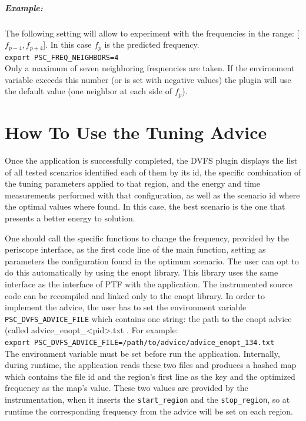 \documentclass[11pt,a4paper, oneside]{book} %
\begin{document}
  \paragraph{Example:} The following setting will allow to experiment with the frequencies in the range: [$f_{p-4},f_{p+4}$]. In this case $f_p$ is the predicted frequency.\\

  \texttt{export PSC\_FREQ\_NEIGHBORS=4}\\


  Only a maximum of seven neighboring frequencies are taken. If the environment variable exceeds this number (or is set with negative values)
  the plugin will use the default value (one neighbor at each side of $f_p$).




\chapter{How To Use the Tuning Advice}
Once the application is successfully completed, the DVFS plugin displays the list of all tested scenarios identified each of them by its id, the specific combination of the tuning
parameters applied to that region, and the energy and time measurements performed with that configuration, as well as the scenario id where the optimal values where found. In this
case, the best scenario is the one that presents a better energy to solution.

One should call the specific functions to change the frequency, provided by the periscope interface, as the first code line of the main function, setting as parameters
the configuration found in the optimum scenario. The user can opt to do this automatically by using the enopt library. This library uses the same interface as the interface of PTF with the application.
The instrumented source code can be recompiled and linked only to the enopt library. In order to implement the advice, the user
has to set the environment variable {\tt PSC\_DVFS\_ADVICE\_FILE} which contains one string:
the path to the enopt advice (called advice\_enopt\_<pid>.txt .
For example:\\
{\tt export PSC\_DVFS\_ADVICE\_FILE=/path/to/advice/advice\_enopt\_134.txt}\\
The environment variable must be set before run the application.
Internally, during runtime, the application reads these two files and produces a hashed map which
contains the file id and the region's first line as the key and the optimized frequency
as the map's value. These two values are provided by the instrumentation, when it inserts the {\tt start\_region}
and the {\tt stop\_region}, so at runtime the corresponding frequency from the advice will be set on each
region.
\end{document}
